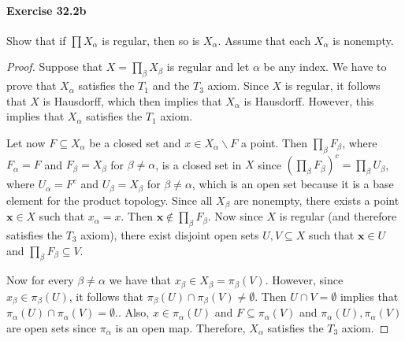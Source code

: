 \documentclass{article}
\begin{document}
\paragraph{Exercise 32.2b} Show that if $\prod X_\alpha$ is regular, then so is $X_\alpha$. Assume that each $X_\alpha$ is nonempty.
\begin{proof}
    Suppose that $X=\prod_\beta X_\beta$ is regular and let $\alpha$ be any index.
We have to prove that $X_\alpha$ satisfies the $T_1$ and the $T_3$ axiom.
Since $X$ is regular, it follows that $X$ is Hausdorff, which then implies that $X_\alpha$ is Hausdorff. However, this implies that $X_\alpha$ satisfies the $T_1$ axiom.

Let now $F \subseteq X_\alpha$ be a closed set and $x \in X_\alpha \backslash F$ a point.
Then $\prod_\beta F_\beta$, where $F_\alpha=F$ and $F_\beta=X_\beta$ for $\beta \neq \alpha$, is a closed set in $X$ since $\left(\prod_\beta F_\beta\right)^c=\prod_\beta U_\beta$, where $U_\alpha=F^c$ and $U_\beta=X_\beta$ for $\beta \neq \alpha$, which is an open set because it is a base element for the product topology.
Since all $X_\beta$ are nonempty, there exists a point $\mathbf{x} \in X$ such that $x_\alpha=x$. Then $\mathbf{x} \notin \prod_\beta F_\beta$.
Now since $X$ is regular (and therefore satisfies the $T_3$ axiom), there exist disjoint open sets $U, V \subseteq X$ such that $\mathbf{x} \in U$ and $\prod_\beta F_\beta \subseteq V$.

Now for every $\beta \neq \alpha$ we have that $x_\beta \in X_\beta=\pi_\beta(V)$. However, since $x_\beta \in \pi_\beta(U)$, it follows that $\pi_\beta(U) \cap \pi_\beta(V) \neq \emptyset$.
Then $U \cap V=\emptyset$ implies that $\pi_\alpha(U) \cap \pi_\alpha(V)=\emptyset$.. Also, $x \in \pi_\alpha(U)$ and $F \subseteq \pi_\alpha(V)$ and $\pi_\alpha(U), \pi_\alpha(V)$ are open sets since $\pi_\alpha$ is an open map.
Therefore, $X_\alpha$ satisfies the $T_3$ axiom.
\end{proof}
\end{document}

